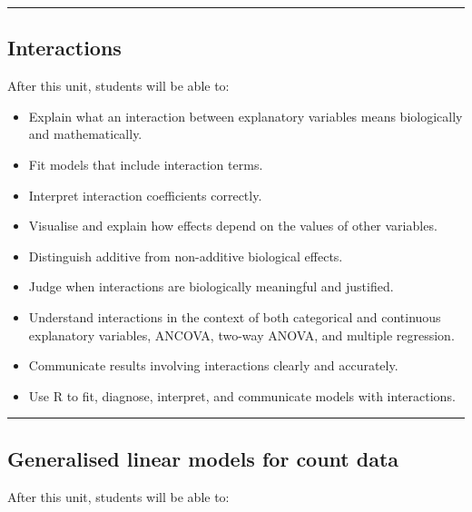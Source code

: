 \documentclass[
  letterpaper,
  8pt,
  a4paper]{book}
\providecommand{\tightlist}{%
  \setlength{\itemsep}{0pt}\setlength{\parskip}{0pt}}
\begin{document}
\begin{center}\rule{0.5\linewidth}{0.5pt}\end{center}

\subsection*{Interactions}\label{interactions}

After this unit, students will be able to:

\begin{itemize}
\tightlist
\item
  Explain what an interaction between explanatory variables means
  biologically and mathematically.
\item
  Fit models that include interaction terms.
\item
  Interpret interaction coefficients correctly.
\item
  Visualise and explain how effects depend on the values of other
  variables.
\item
  Distinguish additive from non-additive biological effects.
\item
  Judge when interactions are biologically meaningful and justified.
\item
  Understand interactions in the context of both categorical and
  continuous explanatory variables, ANCOVA, two-way ANOVA, and multiple
  regression.
\item
  Communicate results involving interactions clearly and accurately.
\item
  Use R to fit, diagnose, interpret, and communicate models with
  interactions.
\end{itemize}

\begin{center}\rule{0.5\linewidth}{0.5pt}\end{center}

\subsection*{Generalised linear models for count
data}\label{generalised-linear-models-for-count-data}

After this unit, students will be able to:
\end{document}
